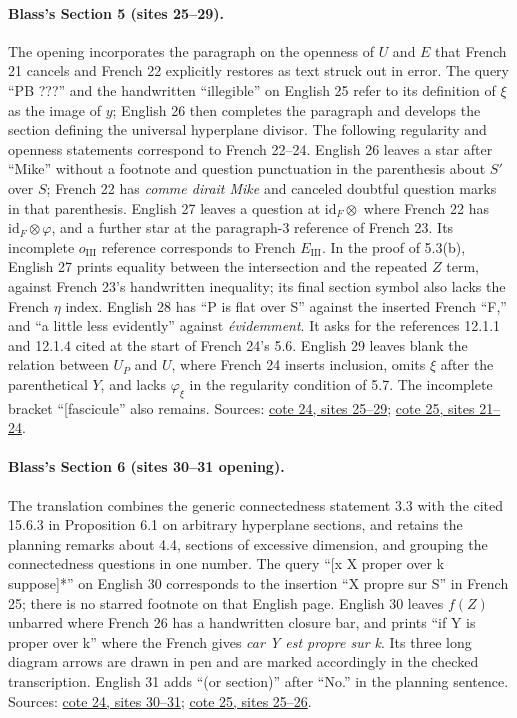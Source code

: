 \paragraph{Blass's Section 5 (sites 25--29).}
The opening incorporates the paragraph on the openness of $U$ and $E$ that French 21 cancels and French 22 explicitly restores as text struck out in error. The query ``PB ???'' and the handwritten ``illegible'' on English 25 refer to its definition of $\xi$ as the image of $y$; English 26 then completes the paragraph and develops the section defining the universal hyperplane divisor. The following regularity and openness statements correspond to French 22--24. English 26 leaves a star after ``Mike'' without a footnote and question punctuation in the parenthesis about $S'$ over $S$; French 22 has \emph{comme dirait Mike} and canceled doubtful question marks in that parenthesis. English 27 leaves a question at $\mathrm{id}_F\otimes$ where French 22 has $\mathrm{id}_F\otimes\varphi$, and a further star at the paragraph-3 reference of French 23. Its incomplete $o_{\mathrm{III}}$ reference corresponds to French $E_{\mathrm{III}}$. In the proof of 5.3(b), English 27 prints equality between the intersection and the repeated $Z$ term, against French 23's handwritten inequality; its final section symbol also lacks the French $\eta$ index. English 28 has ``P is flat over S'' against the inserted French ``F,'' and ``a little less evidently'' against \emph{évidemment}. It asks for the references 12.1.1 and 12.1.4 cited at the start of French 24's 5.6. English 29 leaves blank the relation between $U_P$ and $U$, where French 24 inserts inclusion, omits $\xi$ after the parenthetical $Y$, and lacks $\varphi_\xi$ in the regularity condition of 5.7. The incomplete bracket ``[fascicule'' also remains. Sources: \href{https://grothendieck.umontpellier.fr/web/viewer.html?file=../24.pdf\#page=26}{cote 24, sites 25--29}; \href{https://grothendieck.umontpellier.fr/web/viewer.html?file=../25.pdf\#page=22}{cote 25, sites 21--24}.

\paragraph{Blass's Section 6 (sites 30--31 opening).}
The translation combines the generic connectedness statement 3.3 with the cited 15.6.3 in Proposition 6.1 on arbitrary hyperplane sections, and retains the planning remarks about 4.4, sections of excessive dimension, and grouping the connectedness questions in one number. The query ``[x X proper over k suppose]*'' on English 30 corresponds to the insertion ``X propre sur S'' in French 25; there is no starred footnote on that English page. English 30 leaves $f(Z)$ unbarred where French 26 has a handwritten closure bar, and prints ``if Y is proper over k'' where the French gives \emph{car Y est propre sur k}. Its three long diagram arrows are drawn in pen and are marked accordingly in the checked transcription. English 31 adds ``(or section)'' after ``No.'' in the planning sentence. Sources: \href{https://grothendieck.umontpellier.fr/web/viewer.html?file=../24.pdf\#page=31}{cote 24, sites 30--31}; \href{https://grothendieck.umontpellier.fr/web/viewer.html?file=../25.pdf\#page=26}{cote 25, sites 25--26}.

